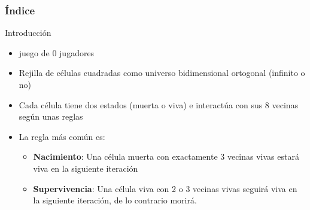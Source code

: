 \documentclass{mybeamer}
\institute{
	{\textsl{\large Proyecto}}
	\\[1em]
	\textbf{\Large Juego de la vida}
}
\begin{document}
\begin{frame}
\titlepage
\end{frame}

\begin{frame}
\frametitle{Índice}
\tableofcontents
\end{frame}

\begin{framesec}{Introducción}
	\centering
	\begin{itemize}
		\item juego de 0 jugadores
		\item Rejilla de células cuadradas como universo bidimensional
			ortogonal (infinito o no)
		\item Cada célula tiene dos estados (muerta o viva) e interactúa
			con sus 8 vecinas según unas reglas
		\item La regla más común es:
		\begin{itemize}
			\item \textbf{Nacimiento}: Una célula muerta con
				exactamente 3 vecinas vivas estará viva en la
				siguiente iteración
			\item \textbf{Supervivencia}: Una célula viva con 2 o 3
				vecinas vivas seguirá viva en la siguiente
				iteración, de lo contrario morirá.
		\end{itemize}
	\end{itemize}
\end{framesec}
\end{document}
